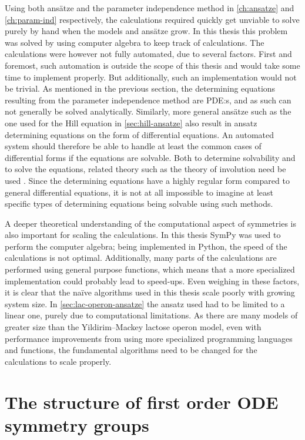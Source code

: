 Using both ansätze and the parameter independence method in \cref{ch:ansatze} and \cref{ch:param-ind} respectively, the calculations required quickly get unviable to solve purely by hand when the models and ansätze grow.
In this thesis this problem was solved by using computer algebra to keep track of calculations.
The calculations were however not fully automated, due to several factors.
First and foremost, such automation is outside the scope of this thesis and would take some time to implement properly.
But additionally, such an implementation would not be trivial.
As mentioned in the previous section, the determining equations resulting from the parameter independence method are PDE:s, and as such can not generally be solved analytically.
Similarly, more general ansätze such as the one used for the Hill equation in \cref{sec:hill-ansatze} also result in ansatz determining equations on the form of differential equations.
An automated system should therefore be able to handle at least the common cases of differential forms if the equations are solvable.
Both to determine solvability and to solve the equations, related theory such as the theory of involution need be used \cite{seiler2009involution}.
Since the determining equations have a highly regular form compared to general differential equations, it is not at all impossible to imagine at least specific types of determining equations being solvable using such methods.

A deeper theoretical understanding of the computational aspect of symmetries is also important for scaling the calculations.
In this thesis SymPy \cite{meurer2017sympy} was used to perform the computer algebra; being implemented in Python, the speed of the calculations is not optimal.
Additionally, many parts of the calculations are performed using general purpose functions, which means that a more specialized implementation could probably lead to speed-ups.
Even weighing in these factors, it is clear that the naïve algorithms used in this thesis scale poorly with growing system size.
In \cref{sec:lac-operon-ansatze} the ansatz used had to be limited to a linear one, purely due to computational limitations.
As there are many models of greater size than the Yildirim--Mackey lactose operon model, even with performance improvements from using more specialized programming languages and functions, the fundamental algorithms need to be changed for the calculations to scale properly.

\section{The structure of first order ODE symmetry groups}

